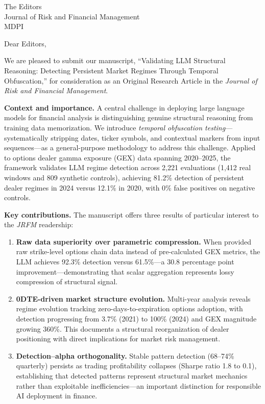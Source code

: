 \documentclass[11pt]{letter}
\begin{document}
\begin{letter}{The Editors \\ Journal of Risk and Financial Management \\ MDPI}

\opening{Dear Editors,}

We are pleased to submit our manuscript, ``Validating LLM Structural Reasoning: Detecting Persistent Market Regimes Through Temporal Obfuscation,'' for consideration as an Original Research Article in the \textit{Journal of Risk and Financial Management}.

\textbf{Context and importance.}
A central challenge in deploying large language models for financial analysis is distinguishing genuine structural reasoning from training data memorization. We introduce \textit{temporal obfuscation testing}---systematically stripping dates, ticker symbols, and contextual markers from input sequences---as a general-purpose methodology to address this challenge. Applied to options dealer gamma exposure (GEX) data spanning 2020--2025, the framework validates LLM regime detection across 2,221 evaluations (1,412 real windows and 809 synthetic controls), achieving 81.2\% detection of persistent dealer regimes in 2024 versus 12.1\% in 2020, with 0\% false positives on negative controls.

\textbf{Key contributions.}
The manuscript offers three results of particular interest to the \textit{JRFM} readership:

\begin{enumerate}
\item \textbf{Raw data superiority over parametric compression.} When provided raw strike-level options chain data instead of pre-calculated GEX metrics, the LLM achieves 92.3\% detection versus 61.5\%---a 30.8 percentage point improvement---demonstrating that scalar aggregation represents lossy compression of structural signal.

\item \textbf{0DTE-driven market structure evolution.} Multi-year analysis reveals regime evolution tracking zero-days-to-expiration options adoption, with detection progressing from 3.7\% (2021) to 100\% (2024) and GEX magnitude growing 360\%. This documents a structural reorganization of dealer positioning with direct implications for market risk management.

\item \textbf{Detection--alpha orthogonality.} Stable pattern detection (68--74\% quarterly) persists as trading profitability collapses (Sharpe ratio 1.8 to 0.1), establishing that detected patterns represent structural market mechanics rather than exploitable inefficiencies---an important distinction for responsible AI deployment in finance.
\end{enumerate}


\end{letter}
\end{document}

